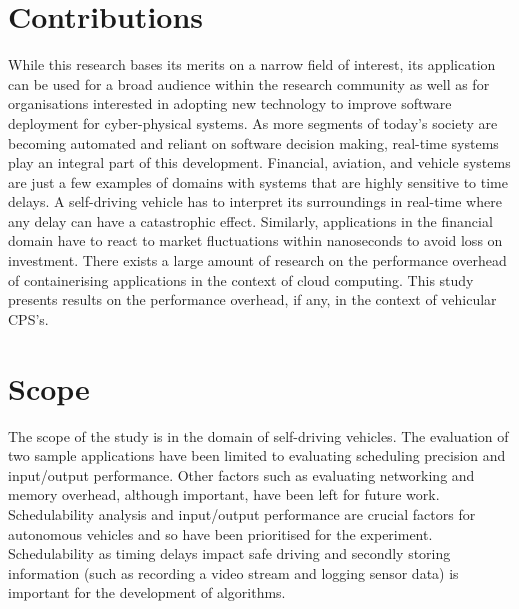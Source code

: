 \section{Contributions}

While this research bases its merits on a narrow field of interest, its application can be used for a broad audience within the research community as well as for organisations interested in adopting new technology to improve software deployment for cyber-physical systems. As more segments of today’s society are becoming automated and reliant on software decision making, real-time systems play an integral part of this development. Financial, aviation, and vehicle systems are just a few examples of domains with systems that are highly sensitive to time delays. A self-driving vehicle has to interpret its surroundings in real-time where any delay can have a catastrophic effect. Similarly, applications in the financial domain have to react to market fluctuations within nanoseconds to avoid loss on investment. There exists a large amount of research on the performance overhead of containerising applications in the context of cloud computing. This study presents results on the performance overhead, if any, in the context of vehicular CPS's. 

\section{Scope}
The scope of the study is in the domain of self-driving vehicles. The evaluation of two sample applications have been limited to evaluating scheduling precision and input/output performance. Other factors such as evaluating networking and memory overhead, although important, have been left for future work. Schedulability analysis and input/output performance are crucial factors for autonomous vehicles and so have been prioritised for the experiment. Schedulability as timing delays impact safe driving and secondly storing information (such as recording a video stream and logging sensor data) is important for the development of algorithms. 


